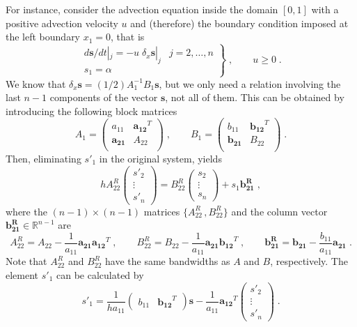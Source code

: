 {For instance, consider the advection equation inside the domain $[0,1]$ with a
positive advection velocity $u$ and (therefore) the boundary condition imposed
at the left boundary $x_1=0$, that is
\begin{equation}
  \left.\begin{array}{ll}
      d\mathbf{s}/dt|_j = -u\; \delta_x \mathbf{s}|_j & j=2,\ldots,n\\
      s_1=\alpha
    \end{array}\right\} \;,\qquad u\ge 0  \;.
\label{equ:problem2}
\end{equation}
We know that $\delta_x \mathbf{s} = (1/2)A_1^{-1}B_1\mathbf{s}$, but we only
need a relation involving the last $n-1$ components of the vector $\mathbf{s}$,
not all of them. This can be obtained by introducing the following block
matrices \citep{Lomax:1998,Mellado:2012}
\begin{equation*}
A_1=
\left(\begin{array}{cc}a_{11}&\mathbf{a_{12}}^T \\\mathbf{a_{21}}   &A_{22}\\
\end{array}\right) \;, \qquad
B_1=
\left(\begin{array}{cc}b_{11}&\mathbf{b_{12}}^T \\\mathbf{b_{21}}   &B_{22}\\
\end{array}\right) \;.
\end{equation*}
Then, eliminating $s'_1$ in the original system, yields
\begin{equation}
hA^R_{22}
\left(\begin{array}{c}s'_2\\\vdots\\s'_n\end{array}\right) =
B^R_{22}\left(\begin{array}{c}s_2\\\vdots\\s_n\end{array}\right)+
s_1\mathbf{b^R_{21}} \;,
\end{equation}
where the $(n-1)\times (n-1)$ matrices $\{A^R_{22}\,,B^R_{22}\}$ and the column
vector $\mathbf{b^R_{21}}\in\mathbb{R}^{n-1}$ are
\begin{equation}
A^R_{22}=A_{22}-\frac{1}{a_{11}}\mathbf{a_{21}}\mathbf{a_{12}}^T \;,\qquad
B^R_{22}=B_{22}-\frac{1}{a_{11}}\mathbf{a_{21}}\mathbf{b_{12}}^T \;,\qquad
\mathbf{b^R_{21}}=\mathbf{b_{21}}-\frac{b_{11}}{a_{11}}\mathbf{a_{21}} \;.
\end{equation}
Note that $A^R_{22}$ and $B^R_{22}$ have the same bandwidths as $A$ and $B$,
respectively. The element $s'_1$ can be calculated by
\begin{equation}
s'_1=\frac{1}{ha_{11}} 
\left(\begin{array}{cc}b_{11}\!&\!\mathbf{b_{12}}^T\end{array}\right)
\mathbf{s} - \frac{1}{a_{11}}
\mathbf{a_{12}}^T \left(\begin{array}{c}s'_2\\\vdots\\s'_n\end{array}\right)\;.
\end{equation}


}
